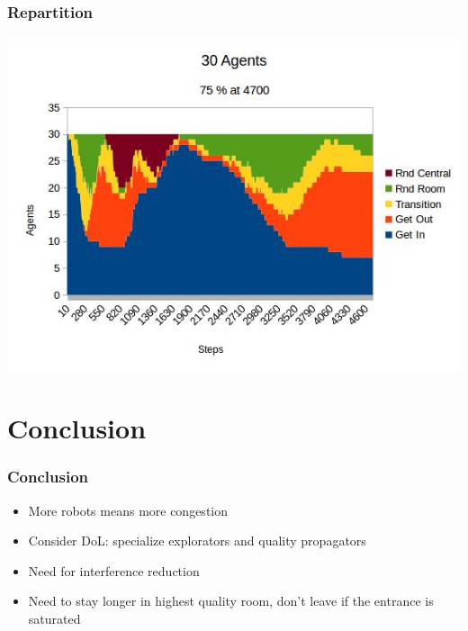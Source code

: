 \documentclass[xcolor={x11names, rgb, usenames, dvipsnames}]{beamer}
\begin{document}
\begin{frame}
\frametitle{Repartition}
\includegraphics[height=\textheight]{agents_30}
\end{frame}












\section{Conclusion}
\begin{frame}
\frametitle{Conclusion}
\begin{itemize}
	\item More robots means more congestion
	\item Consider DoL: specialize explorators and quality propagators
	\item Need for interference reduction
	\item Need to stay longer in highest quality room, don't leave if the entrance is saturated
\end{itemize}
\end{frame}
		
\end{document}
